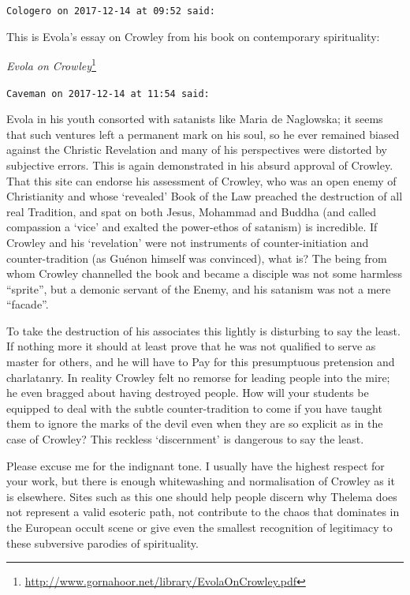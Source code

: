 \begin{footnotesize}
\begin{sffamily}
\hfill

\texttt{Cologero on 2017-12-14 at 09:52 said:}

This is Evola's essay on Crowley from his book on contemporary spirituality:

\textit{Evola on Crowley}\footnote{\url{http://www.gornahoor.net/library/EvolaOnCrowley.pdf}}

\hfill

\texttt{Caveman on 2017-12-14 at 11:54 said:}

Evola in his youth consorted with satanists like Maria de Naglowska; it seems that such ventures left a permanent mark on his soul, so he ever remained biased against the Christic Revelation and many of his perspectives were distorted by subjective errors. This is again demonstrated in his absurd approval of Crowley. That this site can endorse his assessment of Crowley, who was an open enemy of Christianity and whose `revealed' Book of the Law preached the destruction of all real Tradition, and spat on both Jesus, Mohammad and Buddha (and called compassion a `vice' and exalted the power-ethos of satanism) is incredible. If Crowley and his `revelation' were not instruments of counter-initiation and counter-tradition (as Guénon himself was convinced), what is? The being from whom Crowley channelled the book and became a disciple was not some harmless ``sprite'', but a demonic servant of the Enemy, and his satanism was not a mere ``facade''.

To take the destruction of his associates this lightly is disturbing to say the least. If nothing more it should at least prove that he was not qualified to serve as master for others, and he will have to Pay for this presumptuous pretension and charlatanry. In reality Crowley felt no remorse for leading people into the mire; he even bragged about having destroyed people. How will your students be equipped to deal with the subtle counter-tradition to come if you have taught them to ignore the marks of the devil even when they are so explicit as in the case of Crowley? This reckless `discernment' is dangerous to say the least.

Please excuse me for the indignant tone. I usually have the highest respect for your work, but there is enough whitewashing and normalisation of Crowley as it is elsewhere. Sites such as this one should help people discern why Thelema does not represent a valid esoteric path, not contribute to the chaos that dominates in the European occult scene or give even the smallest recognition of legitimacy to these subversive parodies of spirituality.


\end{sffamily}
\end{footnotesize}
